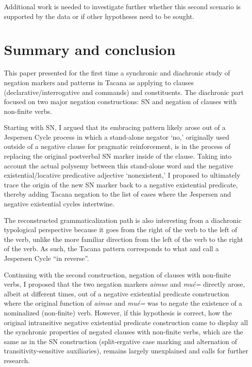 \documentclass[output=paper]{langsci/langscibook}
\begin{document}
Additional work is needed to investigate further whether this second scenario is supported by the data or if other hypotheses need to be sought.

\section{Summary and conclusion}\label{sec:tacana-11}

This paper presented for the first time a synchronic and diachronic study of negation markers and patterns in Tacana as applying to clauses (declarative\slash interrogative and commands) and constituents. The diachronic part focused on two major negation constructions: SN and negation of clauses with non-finite verbs.

Starting with SN, I argued that its embracing pattern likely arose out of a
Jespersen Cycle process in which a stand-alone negator `no,' originally
used outside of a negative clause for pragmatic reinforcement, is in the
process of replacing the original postverbal SN marker inside of the
clause. Taking into account the actual polysemy between this stand-alone
word and the negative existential\slash locative predicative adjective
‘nonexistent,' I proposed to ultimately trace the origin of the new SN
marker back to a negative existential predicate, thereby adding Tacana
negation to the list of cases where the Jespersen and negative existential cycles intertwine.

The reconstructed grammaticalization path is also interesting from a
diachronic typological perspective because it goes from the right of the
verb to the left of the verb, unlike the more familiar direction from the
left of the verb to the right of the verb. As such, the Tacana pattern
corresponds to what \citet{AuweraVossen2016} and \citet{Vossen2016} call a
Jespersen Cycle ``in reverse''.

Continuing with the second construction, negation of clauses with
non-finite verbs, I proposed that the two negation markers \textit{aimue} and \textit{mué=} directly arose, albeit at
different times, out of a negative existential predicate construction where
the original function of \textit{aimue} and \textit{mué=} was to negate the
existence of a nominalized (non-finite) verb. However, if this hypothesis
is correct, how the original
intransitive negative existential predicate construction came to display all the synchronic properties
of negated clauses with non-finite verbs, which are the same as in the SN
construction (split-ergative case marking
and alternation of transitivity-sensitive auxiliaries), remains
largely unexplained and calls for further research.
\end{document}
